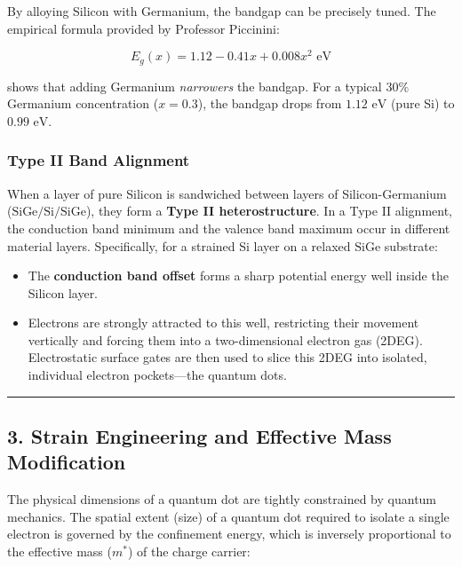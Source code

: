 \documentclass[
]{article}
\providecommand{\tightlist}{%
  \setlength{\itemsep}{0pt}\setlength{\parskip}{0pt}}
\begin{document}
By alloying Silicon with Germanium, the bandgap can be precisely tuned.
The empirical formula provided by Professor Piccinini:

\[E_g(x) = 1.12 - 0.41x + 0.008x^2 \text{ eV}\]

shows that adding Germanium \emph{narrowers} the bandgap. For a typical
\(30\%\) Germanium concentration (\(x = 0.3\)), the bandgap drops from
\(1.12\text{ eV}\) (pure Si) to \(0.99\text{ eV}\).

\subsubsection{Type II Band Alignment}\label{type-ii-band-alignment}

When a layer of pure Silicon is sandwiched between layers of
Silicon-Germanium (\(\text{SiGe/Si/SiGe}\)), they form a \textbf{Type II
heterostructure}. In a Type II alignment, the conduction band minimum
and the valence band maximum occur in different material layers.
Specifically, for a strained Si layer on a relaxed \(\text{SiGe}\)
substrate:

\begin{itemize}
\tightlist
\item
  The \textbf{conduction band offset} forms a sharp potential energy
  well inside the Silicon layer.
\item
  Electrons are strongly attracted to this well, restricting their
  movement vertically and forcing them into a two-dimensional electron
  gas (2DEG). Electrostatic surface gates are then used to slice this
  2DEG into isolated, individual electron pockets---the quantum dots.
\end{itemize}

\begin{center}\rule{0.5\linewidth}{0.5pt}\end{center}

\subsection{3. Strain Engineering and Effective Mass
Modification}\label{strain-engineering-and-effective-mass-modification}

The physical dimensions of a quantum dot are tightly constrained by
quantum mechanics. The spatial extent (size) of a quantum dot required
to isolate a single electron is governed by the confinement energy,
which is inversely proportional to the effective mass (\(m^*\)) of the
charge carrier:
\end{document}

